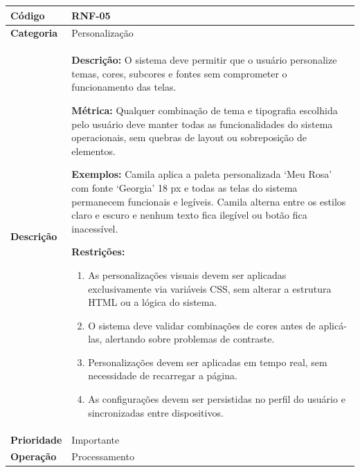\FloatBarrier
\begin{quadro}[h!]
\caption{RNF-05 -- Personalização Visual sem Quebras de Layout}
\label{quad:rnf05}
\begin{tabular}{|p{3.2cm}|p{11.8cm}|}
\hline
\textbf{Código}     & RNF-05 \\ \hline
\textbf{Categoria}  & Personalização \\ \hline
\textbf{Descrição}  &
\textbf{Descrição:} O sistema deve permitir que o usuário personalize temas, cores, subcores e fontes sem comprometer o funcionamento das telas.

\textbf{Métrica:} Qualquer combinação de tema e tipografia escolhida pelo usuário deve manter todas as funcionalidades do sistema operacionais, sem quebras de layout ou sobreposição de elementos.

\textbf{Exemplos:} Camila aplica a paleta personalizada `Meu Rosa' com fonte `Georgia' 18 px e todas as telas do sistema permanecem funcionais e legíveis.
Camila alterna entre os estilos claro e escuro e nenhum texto fica ilegível ou botão fica inacessível.

\textbf{Restrições:}
\begin{enumerate}[nosep,leftmargin=1.2em,topsep=2pt,partopsep=0pt,parsep=0pt,itemsep=1pt]
  \item As personalizações visuais devem ser aplicadas exclusivamente via variáveis CSS, sem alterar a estrutura HTML ou a lógica do sistema.
  \item O sistema deve validar combinações de cores antes de aplicá-las, alertando sobre problemas de contraste.
  \item Personalizações devem ser aplicadas em tempo real, sem necessidade de recarregar a página.
  \item As configurações devem ser persistidas no perfil do usuário e sincronizadas entre dispositivos.
\end{enumerate} \\ \hline
\textbf{Prioridade} & Importante \\ \hline
\textbf{Operação}   & Processamento \\ \hline
\end{tabular}
\end{quadro}

